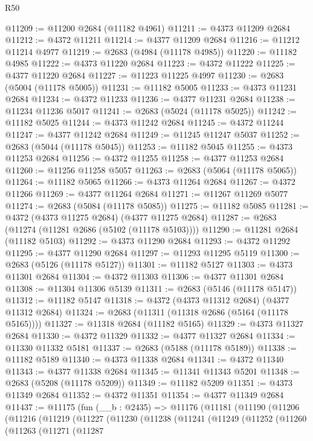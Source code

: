 \begin{lexlean}{R50}
\begin{coremodule}
@11209 := @11200 @2684 (@11182 @4961)
@11211 := @4373 @11209 @2684
@11212 := @4372 @11211
@11214 := @4377 @11209 @2684
@11216 := @11212 @11214 @4977
@11219 := @2683 (@4984 (@11178 @4985))
@11220 := @11182 @4985
@11222 := @4373 @11220 @2684
@11223 := @4372 @11222
@11225 := @4377 @11220 @2684
@11227 := @11223 @11225 @4997
@11230 := @2683 (@5004 (@11178 @5005))
@11231 := @11182 @5005
@11233 := @4373 @11231 @2684
@11234 := @4372 @11233
@11236 := @4377 @11231 @2684
@11238 := @11234 @11236 @5017
@11241 := @2683 (@5024 (@11178 @5025))
@11242 := @11182 @5025
@11244 := @4373 @11242 @2684
@11245 := @4372 @11244
@11247 := @4377 @11242 @2684
@11249 := @11245 @11247 @5037
@11252 := @2683 (@5044 (@11178 @5045))
@11253 := @11182 @5045
@11255 := @4373 @11253 @2684
@11256 := @4372 @11255
@11258 := @4377 @11253 @2684
@11260 := @11256 @11258 @5057
@11263 := @2683 (@5064 (@11178 @5065))
@11264 := @11182 @5065
@11266 := @4373 @11264 @2684
@11267 := @4372 @11266
@11269 := @4377 @11264 @2684
@11271 := @11267 @11269 @5077
@11274 := @2683 (@5084 (@11178 @5085))
@11275 := @11182 @5085
@11281 := @4372 (@4373 @11275 @2684) (@4377 @11275 @2684)
@11287 := @2683 (@11274 (@11281 @2686 (@5102 (@11178 @5103))))
@11290 := @11281 @2684 (@11182 @5103)
@11292 := @4373 @11290 @2684
@11293 := @4372 @11292
@11295 := @4377 @11290 @2684
@11297 := @11293 @11295 @5119
@11300 := @2683 (@5126 (@11178 @5127))
@11301 := @11182 @5127
@11303 := @4373 @11301 @2684
@11304 := @4372 @11303
@11306 := @4377 @11301 @2684
@11308 := @11304 @11306 @5139
@11311 := @2683 (@5146 (@11178 @5147))
@11312 := @11182 @5147
@11318 := @4372 (@4373 @11312 @2684) (@4377 @11312 @2684)
@11324 := @2683 (@11311 (@11318 @2686 (@5164 (@11178 @5165))))
@11327 := @11318 @2684 (@11182 @5165)
@11329 := @4373 @11327 @2684
@11330 := @4372 @11329
@11332 := @4377 @11327 @2684
@11334 := @11330 @11332 @5181
@11337 := @2683 (@5188 (@11178 @5189))
@11338 := @11182 @5189
@11340 := @4373 @11338 @2684
@11341 := @4372 @11340
@11343 := @4377 @11338 @2684
@11345 := @11341 @11343 @5201
@11348 := @2683 (@5208 (@11178 @5209))
@11349 := @11182 @5209
@11351 := @4373 @11349 @2684
@11352 := @4372 @11351
@11354 := @4377 @11349 @2684
@11437 := @11175
    (fun (__b : @2435) =>
    @11176
      (@11181
        (@11190
          (@11206
            (@11216
              (@11219
                (@11227
                  (@11230
                    (@11238
                      (@11241
                        (@11249
                          (@11252
                            (@11260
                              (@11263
                                (@11271
                                  (@11287

\end{coremodule}
\end{lexlean}
